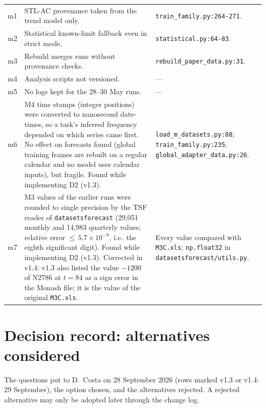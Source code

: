 \documentclass[11pt,a4paper]{article}
\newcommand{\code}[1]{\texttt{#1}}
\begin{document}
{\begin{longtable}{@{}p{0.8cm} p{8.8cm} p{5.6cm}@{}}
m1 & STL-AC provenance taken from the trend model only. & \code{train_family.py:264-271}. \\
m2 & Statistical known-limit fallback even in strict mode. & \code{statistical.py:64-83}. \\
m3 & Rebuild merges runs without provenance checks. & \code{rebuild_paper_data.py:31}. \\
m4 & Analysis scripts not versioned. & --- \\
m5 & No logs kept for the 28--30 May runs. & --- \\
m6 & M4 time stamps (integer positions) were converted to nanosecond date-times, so a task's inferred frequency depended on which series came first. No effect on forecasts found (global training frames are rebuilt on a regular calendar and no model uses calendar inputs), but fragile. Found while implementing D2 (v1.3). & \code{load_m_datasets.py:88}; \code{train_family.py:235}; \code{global_adapter_data.py:26}. \\
m7 & M3 values of the earlier runs were rounded to single precision by the TSF reader of \code{datasetsforecast} (29,051 monthly and 14,983 quarterly values; relative error ${\le}\,5.7\times10^{-8}$, i.e.\ the eighth significant digit). Found while implementing D2 (v1.3). Corrected in v1.4: v1.3 also listed the value $-1200$ of N2786 at $t=84$ as a sign error in the Monash file; it is the value of the original \code{M3C.xls}. & Every value compared with \code{M3C.xls}; \code{np.float32} in \code{datasetsforecast/utils.py}. \\
\end{longtable}
}

\section{Decision record: alternatives considered}\label{app:alternatives}

The questions put to D.\ Costa on 28 September 2026 (rows marked v1.3 or v1.4: 29 September), the option chosen, and the alternatives
rejected. A rejected alternative may only be adopted later through the change log.
\end{document}
